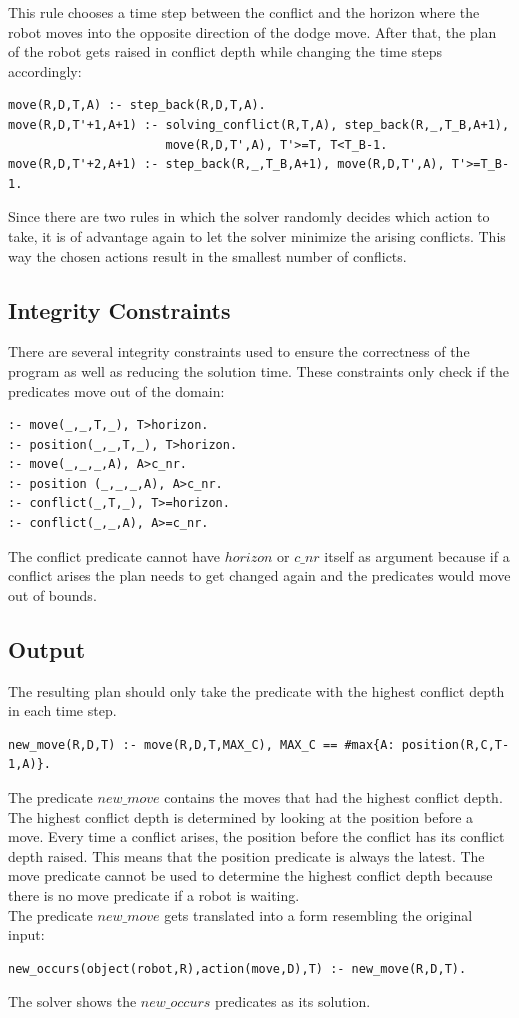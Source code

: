 \documentclass[runningheads]{llncs}
\begin{document}
This rule chooses a time step between the conflict and the horizon where the robot moves into the opposite direction of the dodge move. After that, the plan of the robot gets raised in conflict depth while changing the time steps accordingly:
\begin{verbatim}
move(R,D,T,A) :- step_back(R,D,T,A).
move(R,D,T'+1,A+1) :- solving_conflict(R,T,A), step_back(R,_,T_B,A+1), 
                      move(R,D,T',A), T'>=T, T<T_B-1.
move(R,D,T'+2,A+1) :- step_back(R,_,T_B,A+1), move(R,D,T',A), T'>=T_B-1.
\end{verbatim}
Since there are two rules in which the solver randomly decides which action to take, it is of advantage again to let the solver minimize the arising conflicts. This way the chosen actions result in the smallest number of conflicts.

\subsection{Integrity Constraints}
There are several integrity constraints used to ensure the correctness of the program as well as reducing the solution time.
These constraints only check if the predicates move out of the domain:
\begin{verbatim}
:- move(_,_,T,_), T>horizon.
:- position(_,_,T,_), T>horizon.
:- move(_,_,_,A), A>c_nr.
:- position (_,_,_,A), A>c_nr.
:- conflict(_,T,_), T>=horizon.
:- conflict(_,_,A), A>=c_nr.
\end{verbatim}
The conflict predicate cannot have $horizon$ or $c\_nr$ itself as argument because if a conflict arises the plan needs to get changed again and the predicates would move out of bounds.


\subsection{Output}
The resulting plan should only take the predicate with the highest conflict depth in each time step. 
\begin{verbatim}
new_move(R,D,T) :- move(R,D,T,MAX_C), MAX_C == #max{A: position(R,C,T-1,A)}.
\end{verbatim}
The predicate $new\_move$ contains the moves that had the highest conflict depth. The highest conflict depth is determined by looking at the position before a move. Every time a conflict arises, the position before the conflict has its conflict depth raised. This means that the position predicate is always the latest. The move predicate cannot be used to determine the highest conflict depth because there is no move predicate if a robot is waiting. \\
The predicate $new\_move$ gets translated into a form resembling the original input:
\begin{verbatim}
new_occurs(object(robot,R),action(move,D),T) :- new_move(R,D,T).
\end{verbatim}
The solver shows the $new\_occurs$ predicates as its solution.
\end{document}
